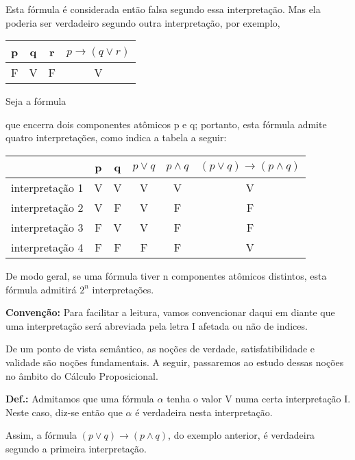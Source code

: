 Esta fórmula é considerada então falsa segundo essa interpretação.
Mas ela poderia ser verdadeiro segundo outra interpretação, por exemplo,

\begin{center}
    \begin{tabular}{c c c c}
        p & q & r & $p \to (q \lor r)$ \\ \hline
        F & V & F & V
    \end{tabular}
\end{center}

\begin{exemplo}
    Seja a fórmula 
\end{exemplo}
\noindent que encerra dois componentes atômicos p e q; portanto, esta fórmula admite quatro interpretações, como indica a tabela a seguir:

\begin{center}
    \begin{tabular}{c | c c c c c}
                        & p & q & $p \lor q$ & $p \land q$ & $(p \lor q) \to (p \land q)$ \\ \hline
        interpretação 1 & V & V & V          & V            & V \\
        interpretação 2 & V & F & V          & F            & F \\
        interpretação 3 & F & V & V          & F            & F \\
        interpretação 4 & F & F & F          & F            & V
    \end{tabular}
\end{center}

De modo geral, se uma fórmula tiver n componentes atômicos distintos, esta fórmula admitirá $2^n$ interpretações.

\bigskip
\noindent
\textbf{Convenção:} Para facilitar a leitura, vamos convencionar daqui em diante que uma interpretação será abreviada pela letra I afetada ou não de indices.

De um ponto de vista semântico, as noções de verdade, satisfatibilidade e validade são noções fundamentais.
A  seguir, passaremos ao  estudo dessas noções no  âmbito do  Cálculo Proposicional.

\bigskip
\noindent
\textbf{Def.:} Admitamos que uma fórmula $\alpha$ tenha o valor V numa certa interpretação I.
Neste caso, diz-se então que $\alpha$ é verdadeira nesta interpretação.

Assim, a fórmula $(p \lor q) \to (p \land q)$, do exemplo anterior, é verdadeira segundo a primeira interpretação.

